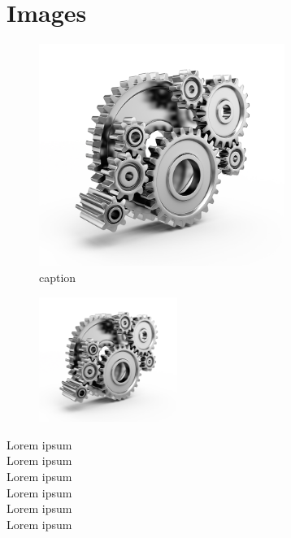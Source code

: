 \documentclass[11pt]{article}
\begin{document}
\UPSTIbuildPage 

\tableofcontents

\newpage
\section{Images}
\begin{figure}[!ht]
    \centering
	\includegraphics[width=8cm]{Src/Images/image.png}
	\caption{caption}
    \label{label}
\end{figure}

\begin{figure}
  \raggedleft
  \vspace{-2em}
  \includegraphics[width=4.5cm]{Src/Images/image.png}
  \vspace{-3em}
\end{figure}
Lorem ipsum \\ Lorem ipsum \\ Lorem ipsum \\ Lorem ipsum \\ Lorem ipsum \\ Lorem ipsum
\end{document}
